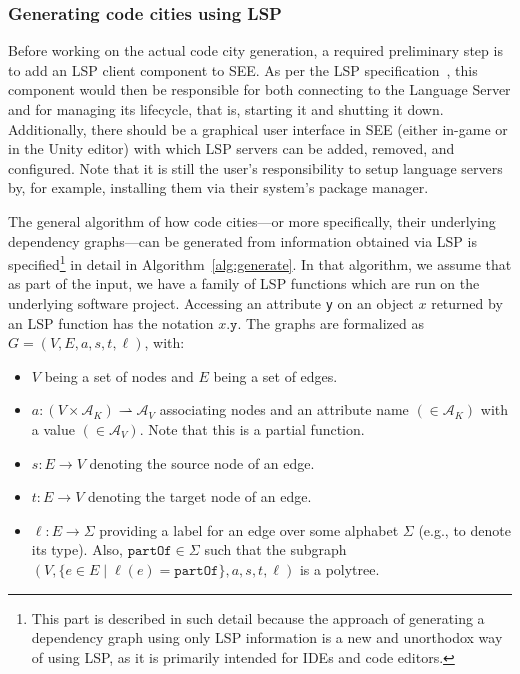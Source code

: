 \documentclass{scrartcl}
\newcommand{\SEE}{\textsc{SEE}}
\begin{document}
{\subsubsection{Generating code cities using LSP}\label{subsubsec:generate}
Before working on the actual code city generation, a required preliminary step is to add an LSP client component to \SEE{}.
As per the LSP specification~\cite{lsp}, this component would then be responsible for both connecting to the Language Server and for managing its lifecycle, that is, starting it and shutting it down.
Additionally, there should be a graphical user interface in \SEE{} (either in-game or in the Unity editor) with which LSP servers can be added, removed, and configured.
Note that it is still the user's responsibility to setup language servers by, for example, installing them via their system's package manager.

The general algorithm of how code cities---or more specifically, their underlying dependency graphs---can be generated from information obtained via LSP is specified\footnote{
	This part is described in such detail because the approach of generating a dependency graph using only LSP information is a new and unorthodox way of using LSP, as it is primarily intended for IDEs and code editors.
} in detail in Algorithm~\ref{alg:generate}.
In that algorithm, we assume that as part of the input, we have a family of LSP functions which are run on the underlying software project.
Accessing an attribute \texttt{y} on an object $x$ returned by an LSP function has the notation $x\texttt{.y}$.
The graphs are formalized as $G = (V, E, a, s, t, \ell)$, with:
\begin{itemize}
	\item $V$ being a set of nodes and $E$ being a set of edges.
	\item $a: (V \times \mathcal{A}_K) \rightharpoonup \mathcal{A}_V$ associating nodes and an attribute name $(\in \mathcal{A}_{K})$ with a value $(\in \mathcal{A}_{V})$. Note that this is a partial function.
	\item $s: E \rightarrow V$ denoting the source node of an edge.
	\item $t: E \rightarrow V$ denoting the target node of an edge.
	\item $\ell: E \rightarrow \Sigma$ providing a label for an edge over some alphabet $\Sigma$ (e.g., to denote its type).
	      Also, $\texttt{partOf} \in \Sigma$ such that the subgraph $(V, \{e \in E \mid \ell(e) = \texttt{partOf}\}, a, s, t, \ell)$ is a polytree.
\end{itemize}

}
\end{document}
